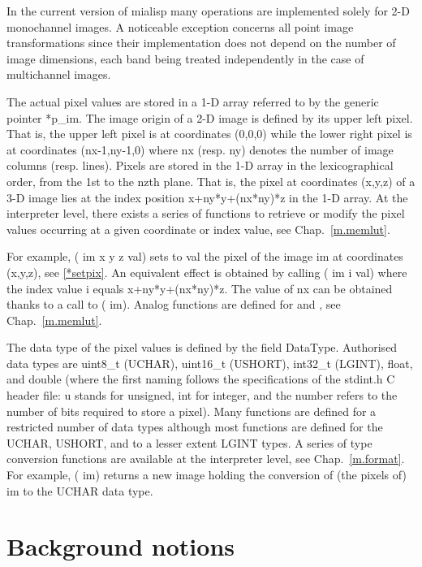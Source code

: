 \documentclass{book}
\begin{document}
In the current version of mialisp many operations are implemented solely for 2-D monochannel images.  A noticeable exception concerns all point image transformations since their implementation does not depend on the number of image dimensions, each band being treated independently in the case of multichannel images.

The actual pixel values are stored in a 1-D array referred to by the generic pointer *p\_im.  The image origin of a 2-D image is defined by its upper left pixel.  That is, the upper left pixel is at coordinates (0,0,0) while the lower right pixel is at coordinates (nx-1,ny-1,0) where nx (resp. ny) denotes the number of image columns (resp. lines).  Pixels are stored in the 1-D array in the lexicographical order, from the 1st to the nzth plane.  That is, the pixel at coordinates (x,y,z) of a 3-D image lies at the index position x+ny*y+(nx*ny)*z in the 1-D array.  At the interpreter level, there exists a series of functions to retrieve or modify the pixel values occurring at a given coordinate or index value, see Chap.~\ref{m.memlut}.

For example, ( im x y z val) sets to val the pixel of the image im at coordinates (x,y,z), see \ref{*setpix}.  An equivalent effect is obtained by calling ( im i val) where the index value i equals x+ny*y+(nx*ny)*z.  The value of nx can be obtained thanks to a call to ( im).  Analog functions are defined for  and  , see Chap.~\ref{m.memlut}.

The data type of the pixel values is defined by the field DataType.  Authorised data types are uint8\_t (UCHAR), uint16\_t (USHORT), int32\_t (LGINT), float, and double (where the first naming follows the specifications of the stdint.h C header file: u stands for unsigned, int for integer, and the number refers to the number of bits required to store a pixel).  Many functions are defined for a restricted number of data types although most functions are defined for the UCHAR, USHORT, and to a lesser extent LGINT types.  A series of type conversion functions are available at the interpreter level, see Chap.~\ref{m.format}.  For example, ( im) returns a new image holding the conversion of (the pixels of) im to the UCHAR data type.



\chapter{Background notions}
\end{document}
